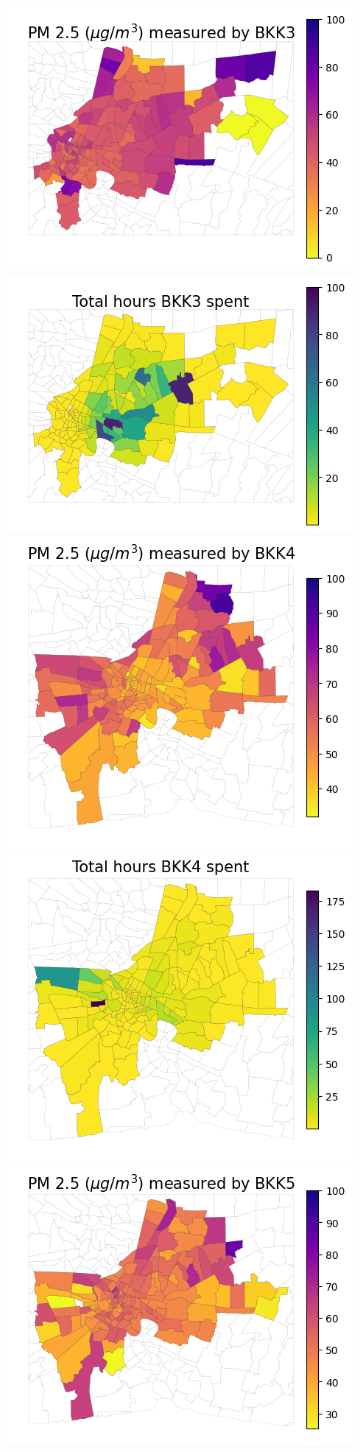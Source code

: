 \begin{figure}
\begin{subfigure}[t]{0.49\textwidth}
        \includegraphics[width=.5\linewidth]{figures/map/BKK3_PM25.png}%
        \includegraphics[width=.5\linewidth]{figures/map/BKK3_time.png}
        \includegraphics[width=.5\linewidth]{figures/map/BKK4_PM25.png}%
        \includegraphics[width=.5\linewidth]{figures/map/BKK4_time.png}
        \includegraphics[width=.5\linewidth]{figures/map/BKK5_PM25.png}%

\end{subfigure}
\end{figure}
